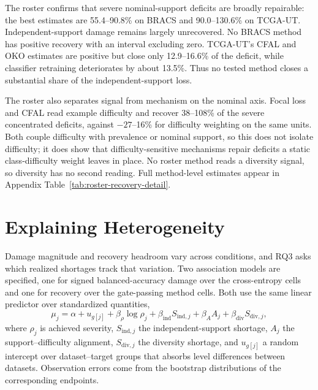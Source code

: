 \documentclass[11pt]{article}
\newcommand{\resultstable}[1]{}
\begin{document}
\begin{table}[ht]
  \centering
  \small
  \resultstable{roster_recovery_summary}
  \caption{Most informative recovery results from the exploratory method roster.}
  \label{tab:roster-recovery}
\end{table}

\noindent The roster confirms that severe nominal-support deficits are broadly repairable: the best estimates are \num{55.4}--\num{90.8}\% on BRACS and \num{90.0}--\num{130.6}\% on TCGA-UT. Independent-support damage remains largely unrecovered. No BRACS method has positive recovery with an interval excluding zero. TCGA-UT's CFAL and OKO estimates are positive but close only \num{12.9}--\num{16.6}\% of the deficit, while classifier retraining deteriorates by about \num{13.5}\%. Thus no tested method closes a substantial share of the independent-support loss.

The roster also separates signal from mechanism on the nominal axis. Focal loss and CFAL read example difficulty and recover \num{38}--\num{108}\% of the severe concentrated deficits, against $-\num{27}$--\num{16}\% for difficulty weighting on the same units. Both couple difficulty with prevalence or nominal support, so this does not isolate difficulty; it does show that difficulty-sensitive mechanisms repair deficits a static class-difficulty weight leaves in place. No roster method reads a diversity signal, so diversity has no second reading. Full method-level estimates appear in Appendix Table~\ref{tab:roster-recovery-detail}.

\section{Explaining Heterogeneity}
\label{sec:rq3}
Damage magnitude and recovery headroom vary across conditions, and RQ3 asks which realized shortages track that variation. Two association models are specified, one for signed balanced-accuracy damage over the cross-entropy cells and one for recovery over the gate-passing method cells. Both use the same linear predictor over standardized quantities,
\begin{equation}
  \mu_j = \alpha + u_{g[j]} + \beta_{\rho}\log \rho_j + \beta_{\mathrm{ind}} S_{\mathrm{ind},j} + \beta_{A} A_j + \beta_{\mathrm{div}} S_{\mathrm{div},j},
  \label{eq:rq3-model}
\end{equation}
\noindent where $\rho_j$ is achieved severity, $S_{\mathrm{ind},j}$ the independent-support shortage, $A_j$ the support--difficulty alignment, $S_{\mathrm{div},j}$ the diversity shortage, and $u_{g[j]}$ a random intercept over dataset--target groups that absorbs level differences between datasets. Observation errors come from the bootstrap distributions of the corresponding endpoints.
\end{document}
